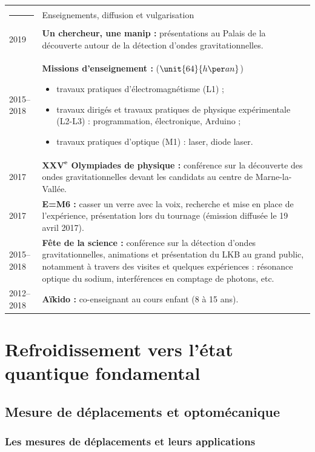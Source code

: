 \documentclass[12pt,a4paper]{article}
\begin{document}
\begin{tabular*}{\textwidth}{p{}<{\raggedleft}p{}}
\textcolor{theme}{\rule{0.12\textwidth}{2.5mm}} &
\large\textcolor{theme}{Enseignements, diffusion et vulgarisation} \vspace{3pt} \\
2019 &
\textbf{Un chercheur, une manip :} présentations au Palais de la découverte autour de la détection d'ondes gravitationnelles.\\
2015--2018 & \textbf{Missions d'enseignement :} ($\unit{64}{h\per an}$)
\begin{itemize}
\item travaux pratiques d'électromagnétisme (L1) ;
\item travaux dirigés et travaux pratiques de physique expérimentale (L2-L3) : programmation, électronique, Arduino ;
\item travaux pratiques d'optique (M1) : laser, diode laser.
\end{itemize}\\
\vspace{-8mm} 2017 &
\vspace{-8mm} \textbf{$\mathrm{\mathbf{XXV^e}}$ Olympiades de physique :} conférence sur la découverte des ondes gravitationnelles devant les candidats au centre de Marne-la-Vallée.\\
2017 &
\textbf{E=M6 :} casser un verre avec la voix, recherche et mise en place de l'expérience, présentation lors du tournage (émission diffusée le 19 avril 2017).\\
2015--2018 &
\textbf{Fête de la science :} conférence sur la détection d'ondes gravitationnelles, animations et présentation du LKB au grand public, notamment à travers des visites et quelques expériences : résonance optique du sodium, interférences en comptage de photons, etc.\\
2012--2018 &
\textbf{Aïkido :} co-enseignant au cours enfant (8 à 15 ans). 
\end{tabular*}

\section{Refroidissement vers l'état quantique fondamental}

\subsection{Mesure de déplacements et optomécanique}
\label{sec:intro}

\subsubsection{Les mesures de déplacements et leurs applications}
\end{document}
